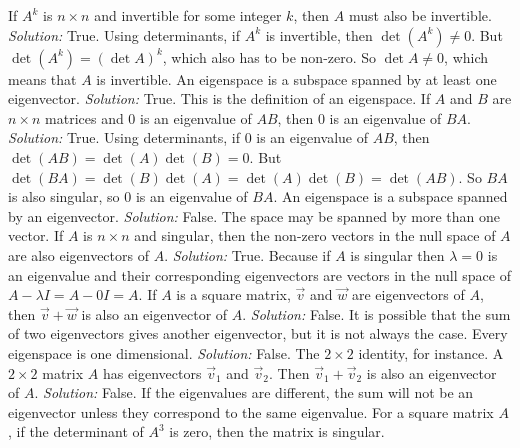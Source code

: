 \ifnum {}         
    If $A^k$ is $n\times n$ and invertible for some integer $k$, then $A$ must also be invertible.
    \ifnum {} {\color{DarkBlue} \textit{Solution:  } True. Using determinants, if $A^k$ is invertible, then $\det(A^k) \ne 0$. But $\det(A^k) = (\det A)^k$, which also has to be non-zero. So $\det A \ne 0$, which means that $A$ is invertible. } \fi
\fi
\ifnum {}      
    An eigenspace is a subspace spanned by at least one eigenvector.
    \ifnum {} {\color{DarkBlue} \textit{Solution:  } True. This is the definition of an eigenspace. } \fi
\fi    
\ifnum {}  
    If $A$ and $B$ are $n \times n$ matrices and 0 is an eigenvalue of $AB$, then 0 is an eigenvalue of $BA$.
    \ifnum {} {\color{DarkBlue} \textit{Solution:  } True. Using determinants, if 0 is an eigenvalue of $AB$, then $\det(AB) = \det(A)\det(B) = 0$. But $\det(BA) = \det(B)\det(A) = \det(A)\det(B) = \det(AB)$. So $BA$ is also singular, so 0 is an eigenvalue of $BA$.} \fi
\fi    
\ifnum {}    
    An eigenspace is a subspace spanned by an eigenvector.
    \ifnum {} {\color{DarkBlue} \textit{Solution: } False. The space may be spanned by more than one vector.  } \fi
\fi   
\ifnum {}    
    If $A$ is $n\times n$ and singular, then the non-zero vectors in the null space of $A$ are also eigenvectors of $A$.
    \ifnum {} {\color{DarkBlue} \textit{Solution:  } True. Because if $A$ is singular then $\lambda=0$ is an eigenvalue and their corresponding eigenvectors are vectors in the null space of $A - \lambda I = A - 0I = A$.  } \fi
\fi    
\ifnum {}      
     If $A$ is a square matrix, $\vec v$ and $\vec w$ are eigenvectors of $A$, then $\vec v + \vec w$ is also an eigenvector of $A$. 
    \ifnum {} {\color{DarkBlue} \textit{Solution:  } False. It is possible that the sum of two eigenvectors gives another eigenvector, but it is not always the case.  } \fi
\fi        
\ifnum {} 
   Every eigenspace is one dimensional.  
    \ifnum {} {\color{DarkBlue} \textit{Solution:  }  False. The $2\times 2$ identity, for instance. } \fi
\fi     
\ifnum {}
   A $2 \times 2$ matrix $A$ has eigenvectors $\vec v_1$ and $\vec v_2$. Then $\vec v_1 + \vec v_2$ is also an eigenvector of $A$.  
    \ifnum {} {\color{DarkBlue} \textit{Solution:  } False. If the eigenvalues are different, the sum will not be an eigenvector unless they correspond to the same eigenvalue.} \fi
\fi     
\ifnum {}
    For a square matrix $A$, if the determinant of $A^3$ is zero, then the matrix is singular. 
